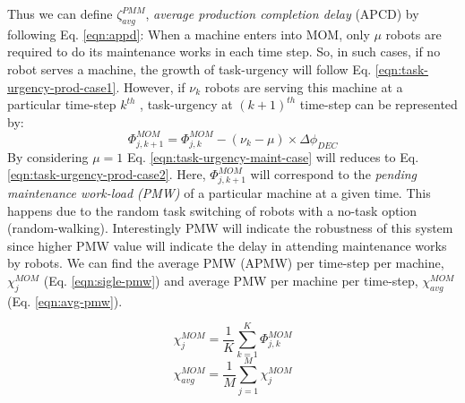 \documentclass{llncs}
\begin{document}
Thus we can define $\zeta_{avg}^{PMM}$, {\em average production completion delay} (APCD) by following Eq. \ref{eqn:appd}:
When a machine enters into MOM, only $\mu$ robots are required to do its maintenance works in each time step. So, in such cases, if no robot serves a machine, the growth of task-urgency will follow Eq. \ref{eqn:task-urgency-prod-case1}. However, if $\nu_{k}$ robots are serving this machine at a particular time-step $k^{th}$ , task-urgency at $(k+1)^{th}$ time-step can be represented by:
\begin{equation}
\Phi_{j, k+1}^{MOM} = \Phi_{j, k}^{MOM}- (\nu_{k} - \mu) \times \Delta \phi_{DEC}
\label{eqn:task-urgency-maint-case}
\end{equation}
By considering $\mu = 1$ Eq. \ref{eqn:task-urgency-maint-case} will reduces to Eq. \ref{eqn:task-urgency-prod-case2}. Here, $\Phi_{j, k+1}^{MOM}$ will correspond to the {\em pending maintenance work-load (PMW)} of a particular machine at a given time. This happens due to the random task switching of robots with a no-task option (random-walking). Interestingly PMW will indicate the robustness of this system since higher PMW value will indicate the delay in attending maintenance works by robots. We can find the average PMW (APMW) per time-step per machine, $\chi_{j}^{MOM}$ (Eq. \ref{eqn:sigle-pmw}) and average PMW per machine per time-step, $\chi_{avg}^{MOM}$ (Eq. \ref{eqn:avg-pmw}).
\begin{multicols}{2}
\small
\begin{equation}
\chi_{j}^{MOM}= \frac{1}{K} \sum_{k=1}^{K} \Phi_{j, k}^{MOM}
\label{eqn:sigle-pmw}
\end{equation}
\vspace*{0.2cm}
\begin{equation}
\chi_{avg}^{MOM}= \frac{1}{M} \sum_{j=1}^{M} {\chi_{j}^{MOM}}
\label{eqn:avg-pmw}
\end{equation}
\end{multicols}
\end{document}
